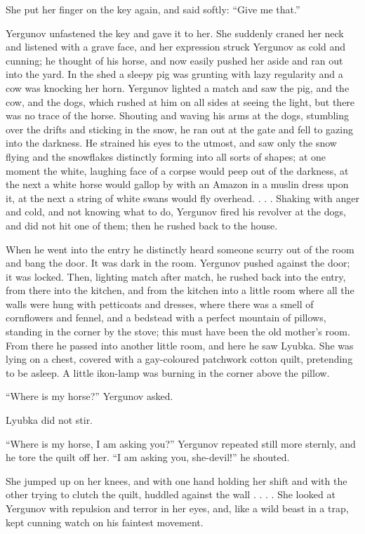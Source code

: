 She put her finger on the key again, and said softly: “Give me that.”

Yergunov unfastened the key and gave it to her. She suddenly craned her
neck and listened with a grave face, and her expression struck Yergunov
as cold and cunning; he thought of his horse, and now easily pushed her
aside and ran out into the yard. In the shed a sleepy pig was grunting
with lazy regularity and a cow was knocking her horn. Yergunov lighted a
match and saw the pig, and the cow, and the dogs, which rushed at him on
all sides at seeing the light, but there was no trace of the horse.
Shouting and waving his arms at the dogs, stumbling over the drifts and
sticking in the snow, he ran out at the gate and fell to gazing into the
darkness. He strained his eyes to the utmost, and saw only the snow
flying and the snowflakes distinctly forming into all sorts of shapes;
at one moment the white, laughing face of a corpse would peep out of the
darkness, at the next a white horse would gallop by with an Amazon in a
muslin dress upon it, at the next a string of white swans would fly
overhead. . . . Shaking with anger and cold, and not knowing what to do,
Yergunov fired his revolver at the dogs, and did not hit one of them;
then he rushed back to the house.

When he went into the entry he distinctly heard someone scurry out of
the room and bang the door. It was dark in the room. Yergunov pushed
against the door; it was locked. Then, lighting match after match, he
rushed back into the entry, from there into the kitchen, and from the
kitchen into a little room where all the walls were hung with petticoats
and dresses, where there was a smell of cornflowers and fennel, and a
bedstead with a perfect mountain of pillows, standing in the corner by
the stove; this must have been the old mother’s room. From there he
passed into another little room, and here he saw Lyubka. She was lying
on a chest, covered with a gay-coloured patchwork cotton quilt,
pretending to be asleep. A little ikon-lamp was burning in the corner
above the pillow.

“Where is my horse?” Yergunov asked.

Lyubka did not stir.

“Where is my horse, I am asking you?” Yergunov repeated still more
sternly, and he tore the quilt off her. “I am asking you, she-devil!” he
shouted.

She jumped up on her knees, and with one hand holding her shift and with
the other trying to clutch the quilt, huddled against the wall . . . .
She looked at Yergunov with repulsion and terror in her eyes, and, like
a wild beast in a trap, kept cunning watch on his faintest movement.

